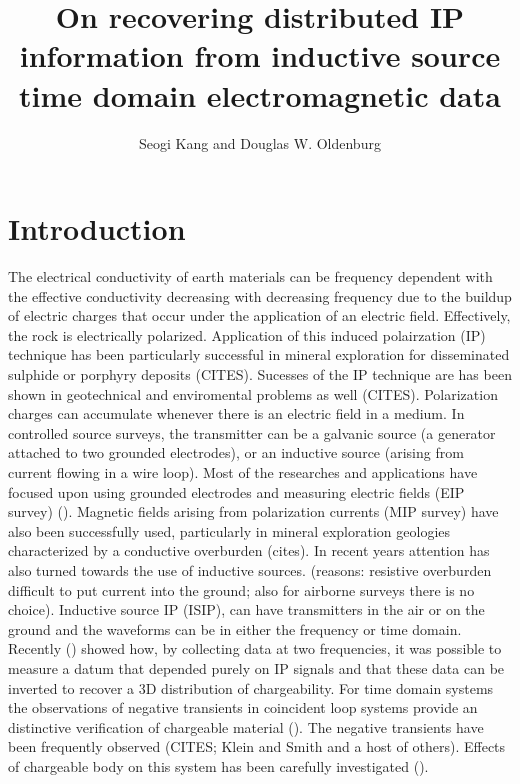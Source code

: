 \documentclass[a4paper, 11pt]{article}
\author{Seogi Kang and Douglas W. Oldenburg}
\title{On recovering distributed IP information from inductive source time domain electromagnetic data}
\begin{document}
\maketitle
\tableofcontents
\clearpage

\section{Introduction}
The electrical conductivity of earth materials can be frequency dependent with the effective conductivity decreasing with decreasing frequency due to the buildup of electric charges that occur under the application of an electric field.
Effectively, the rock is electrically polarized. 
Application of this induced polairzation (IP) technique has been particularly successful in mineral exploration for disseminated sulphide or porphyry deposits (CITES). Sucesses of the IP technique are has been shown in geotechnical and enviromental problems as well (CITES). 
Polarization charges can accumulate whenever there is an electric field in a medium. In controlled source surveys, the transmitter can be a galvanic source (a generator attached to two grounded electrodes), or an inductive source (arising from current flowing in a wire loop). Most of the researches and applications have focused upon using grounded electrodes and measuring electric fields (EIP survey)  (\cite{seigel1959}).   Magnetic fields arising from polarization currents (MIP survey) have also been successfully used, particularly in mineral exploration geologies characterized by a conductive overburden (cites). In recent years attention has also turned towards the use of inductive sources. (reasons:  resistive overburden difficult to put current into the ground; also for airborne surveys there is no choice).  Inductive source IP (ISIP),  can have transmitters in the air or on the ground and the waveforms can be in either the frequency or time domain. Recently  (\cite{Marchant2012b}) showed how, by collecting data at two frequencies, it was possible to measure a datum that depended purely on IP signals and that these data can be inverted to recover a 3D distribution of chargeability. 
For time domain systems the observations of negative transients in coincident loop systems provide an distinctive verification of chargeable material (\cite{Weidelt1982}). The negative transients have been frequently observed (CITES; Klein and Smith and a host of others). Effects of chargeable body on this system has been carefully investigated (\cite{Smith1988a,Flis1989,ElKaliouby2004, Kratzer2012,Marchant2014}). 
\end{document}
